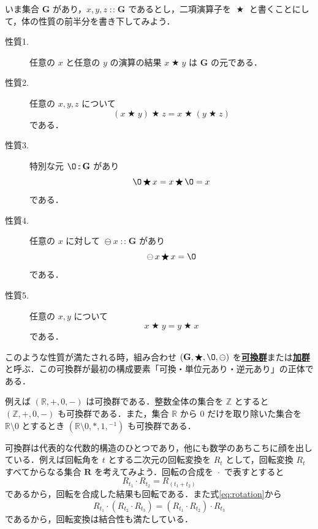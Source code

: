 \documentclass[a4paper,twocolumn]{jsbook}
\newcommand{\keyword}[1]{{\underline{\textbf{#1}}}}
\newcommand{\mZero}{\O}
\DeclareMathOperator{\mBinOp}{\bigstar}
\DeclareMathOperator{\mCompRot}{\cdot}
\DeclareMathOperator{\mIn}{{:\!:}}
\DeclareMathOperator{\mMinus}{\ominus}
\newcommand{\mSet}[1]{\mathbf{#1}}
\newcommand{\mSpecialSet}[1]{\mathbb{#1}} %
\newcommand{\mRSet}{\mSpecialSet{R}}
\newcommand{\mZSet}{\mSpecialSet{Z}}
\newcommand{\mTupleWith}[1]{\left(#1\right)}
\begin{document}
いま集合 $\mSet{G}$ があり，$x,y,z\mIn\mSet{G}$ であるとし，二項演算子を $\mBinOp$ と書くことにして，体の性質の前半分を書き下してみよう．
\begin{description}
\item[性質1.] 任意の $x$ と任意の $y$ の演算の結果 $x\mBinOp y$ は $\mSet{G}$ の元である．
\item[性質2.] 任意の $x,y,z$ について
\begin{equation}
(x\mBinOp y)\mBinOp z=x\mBinOp(y\mBinOp z)
\end{equation}
である．
\item[性質3.] 特別な元 $\mZero\mIn\mSet{G}$ があり
\begin{equation}
\mZero\mBinOp x=x\mBinOp\mZero=x
\end{equation}
である．
\item[性質4.] 任意の $x$ に対して $\mMinus x\mIn\mSet{G}$ があり
\begin{equation}
\mMinus x\mBinOp x=\mZero
\end{equation}
である．
\item[性質5.] 任意の $x,y$ について
\begin{equation}
x\mBinOp y=y\mBinOp x
\end{equation}
である．
\end{description}
このような性質が満たされる時，組み合わせ $\mTupleWith{\mSet{G},\mBinOp,\mZero,\mMinus}$ を\keyword{可換群}または\keyword{加群}と呼ぶ．この可換群が最初の構成要素「可換・単位元あり・逆元あり」の正体である．

例えば $\mTupleWith{\mRSet,+,0,-}$ は可換群である．整数全体の集合を $\mZSet$ とすると $\mTupleWith{\mZSet,+,0,-}$ も可換群である．また，集合 $\mRSet$ から $0$ だけを取り除いた集合を $\mRSet\setminus0$ とするとき $\mTupleWith{\mRSet\setminus0,*,1,{}^{-1}}$ も可換群である．

可換群は代表的な代数的構造のひとつであり，他にも数学のあちこちに顔を出している．例えば回転角を $t$ とする二次元の回転変換を $R_t$ として，回転変換 $R_t$ すべてからなる集合 $\mSet{R}$ を考えてみよう．回転の合成を $\mCompRot$ で表すとすると
\begin{equation}
\label{eq:rotation}
R_{t_1}\mCompRot R_{t_2}=R_{(t_1+t_2)}
\end{equation}
であるから，回転を合成した結果も回転である．また式\eqref{eq:rotation}から
\begin{equation}
R_{t_1}\mCompRot\left(R_{t_2}\mCompRot R_{t_3}\right)=\left(R_{t_1}\mCompRot R_{t_2}\right)\mCompRot R_{t_3}
\end{equation}
であるから，回転変換は結合性も満たしている．
\end{document}
